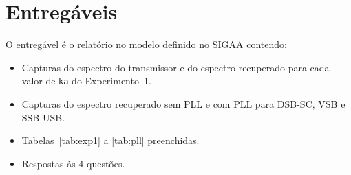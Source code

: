 \documentclass[11pt,a4paper]{article}
\begin{document}
\section{Entregáveis}

O entregável é o relatório no modelo definido no SIGAA contendo:

\begin{itemize}
      \item Capturas do espectro do transmissor e do espectro recuperado para cada
            valor de \texttt{ka} do Experimento~1.
      \item Capturas do espectro recuperado sem PLL e com PLL para DSB-SC, VSB e
            SSB-USB.
      \item Tabelas~\ref{tab:exp1} a \ref{tab:pll} preenchidas.
      \item Respostas às 4 questões.
\end{itemize}
\end{document}
